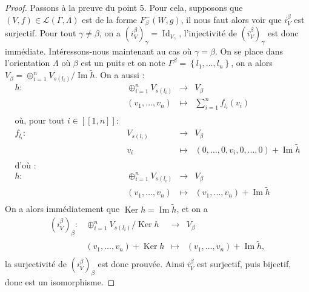 \documentclass[a4paper,10pt]{article}
\DeclareMathOperator{\Ker}{Ker}
\DeclareMathOperator{\Id}{Id}
\DeclareMathOperator{\Img}{Im}
\begin{document}
\begin{proof}
	Passons à la preuve du point 5. Pour cela, supposons que $(V,f)\in\mathscr{L}(\Gamma,\Lambda)$ est de la forme $F_{\beta}^{-}(W,g)$, il nous faut alors voir que $i_{V}^{\beta}$ est surjectif. Pour tout $\gamma\neq\beta$, on a $(i_{V}^{\beta})_{\gamma}=\Id_{V_{\gamma}}$, l'injectivité de $(i_{V}^{\beta})_{\gamma}$ est donc immédiate. Intéressons-nous maintenant au cas où $\gamma=\beta$. On se place dans l'orientation $\Lambda$ où $\beta$ est un puits et on note $\Gamma^{\beta}=\left\{ l_{1},\dots,l_{n} \right\}$, on a alors $V_{\beta}=\oplus_{i=1}^{n}V_{s(l_{i})}/\Img \tilde{h}$. On a aussi :
	\[
\begin{array}{rccc}
	h: & \oplus_{i=1}^{n}V_{s(l_{i})} & \rightarrow & V_{\beta} \\
	& (v_{1},\dots,v_{n}) & \mapsto & \sum_{i=1}^{n}f_{l_{i}}(v_{i})\\
	&&&\\
	\text{où, pour tout }i\in[\![1,n]\!] : &&&\\
	f_{l_{i}}:& V_{s(l_{i})} & \rightarrow & V_{\beta} \\
	& v_{i} & \mapsto & (0,\dots,0,v_{i},0,\dots,0)+\Img \tilde{h}\\
	&&&\\
	\text{d'où :} &&&\\
	h: & \oplus_{i=1}^{n}V_{s(l_{i})} & \rightarrow & V_{\beta} \\
	& (v_{1},\dots,v_{n}) & \mapsto & (v_{1},\dots,v_{n}) + \Img \tilde{h}\\
\end{array}
	\]
	On a alors immédiatement que $\Ker h = \Img \tilde{h}$, et on a
	\[
		\begin{array}{rccc}
			(i_{V}^{\beta})_{\beta} : & \oplus_{i=1}^{n}V_{s(l_{i})}/\Ker h & \rightarrow & V_{\beta}\\
			& (v_{1},\dots,v_{n})+\Ker h & \mapsto & (v_{1},\dots,v_{n})+\Img \tilde{h},\\
		\end{array}
	\]
	la surjectivité de $(i_{V}^{\beta})_{\beta}$ est donc prouvée. Ainsi $i_{V}^{\beta}$ est surjectif, puis bijectif, donc est un isomorphisme.
\end{proof}
\clearpage


\end{document}
